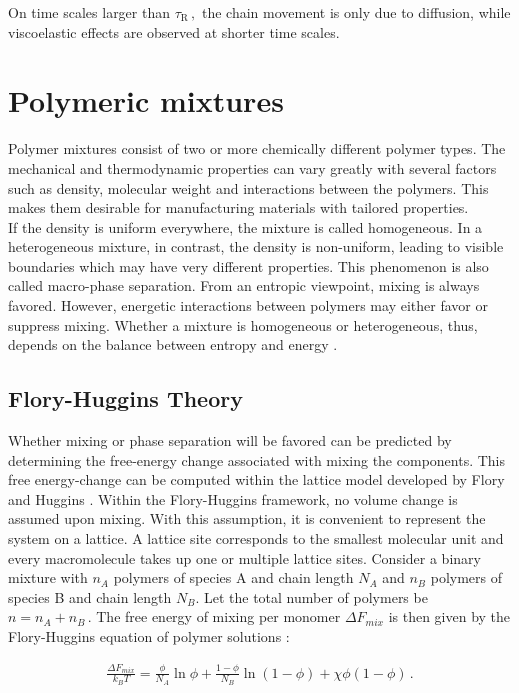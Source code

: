 \documentclass[bachelor,       %
               oneside,        %
               BCOR10mm,       %
               ngerman, english %
               ]{GAUBM}
\begin{document}
On time scales larger than $\tau_\mathrm R\,,$ the chain movement is only due to diffusion, while viscoelastic effects are observed at shorter time scales. 
 
 
\section{Polymeric mixtures}
Polymer mixtures consist of two or more chemically different polymer types. The mechanical and thermodynamic properties can vary greatly with several factors such as density, molecular weight and interactions between the polymers. This makes them desirable for manufacturing materials with tailored properties.\\
If the density is uniform everywhere, the mixture is called homogeneous. In a heterogeneous mixture, in contrast, the density is non-uniform, leading to visible boundaries which may have very different properties. This phenomenon is also called macro-phase separation. From an entropic viewpoint, mixing is always favored. However, energetic interactions between polymers may either favor or suppress mixing. Whether a mixture is homogeneous or heterogeneous, thus,  depends on the balance between entropy and energy \cite[S. 137]{Rubin03}.           

\subsection{Flory-Huggins Theory}

Whether mixing or phase separation will be favored can be predicted by determining the free-energy change associated with mixing the components. This free energy-change can be computed within the lattice model developed by Flory and Huggins \cite{Flory42}. Within the Flory-Huggins framework, no volume change is assumed upon mixing. With this assumption, it is convenient to represent the system on a lattice. A lattice site corresponds to the smallest molecular unit and every macromolecule takes up one or multiple lattice sites. Consider a binary mixture with $n_A$ polymers of species A and chain length $N_A$ and $n_B$ polymers of species B and chain length $N_B$. Let the total number of polymers be $n=n_A+n_B\,.$ The free energy of mixing per monomer $\Delta F_{mix}$ is then given by the Flory-Huggins equation of polymer solutions \cite[S. 143]{Rubin03}:

\begin{align}
  \frac{\Delta F_{mix}}{k_BT}=\frac{\phi}{N_A}\ln\phi+\frac{1-\phi}{N_B}\ln(1-\phi)+\chi\phi(1-\phi)\,.
  \label{eq:floryhuggins}
\end{align}
\end{document}
